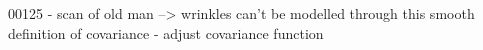 \begin{figure}[h!]
   \caption{}
\label{fig:caricature}
\end{figure}




00125 - scan of old man --> wrinkles can't be modelled through this smooth definition of covariance - adjust covariance function
